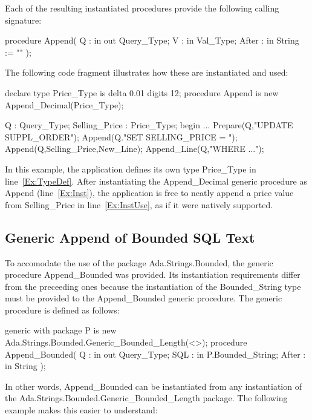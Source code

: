 \documentclass[english,letterpaper]{book}
\begin{document}
Each of the resulting instantiated procedures provide the following
calling signature:

\begin{Code}
procedure Append(
   Q :     in out Query_Type;
   V :     in     Val_Type;
   After : in     String := ""
);
\end{Code}

The following code fragment illustrates how these are instantiated and used:

\begin{NumberedExample}
declare
   type Price_Type is delta 0.01 digits 12;\label{Ex:TypeDef}
   procedure Append is new Append_Decimal(Price_Type);\label{Ex:Inst}

   Q :             Query_Type;
   Selling_Price : Price_Type;
begin
   ...
   Prepare(Q,"UPDATE SUPPL_ORDER");
   Append(Q."SET SELLING_PRICE = ");
   Append(Q,Selling_Price,New_Line);\label{Ex:InstUse}
   Append_Line(Q,"WHERE ...");
\end{NumberedExample}

In this example, the application defines its own type Price\_Type
in line~\ref{Ex:TypeDef}. After instantiating the Append\_Decimal
generic procedure as Append (line~\ref{Ex:Inst}), the application is
free to neatly append a price value from Selling\_Price in
line~\ref{Ex:InstUse}, as if it were natively supported.



\subsection{Generic Append of Bounded SQL Text}

To accomodate the use of the package Ada\-.Strings\-.Bounded,
the generic procedure Append\_Bounded was provided. Its instantiation
requirements differ from the preceeding ones because the instantiation
of the Bounded\_String type must be provided to the Append\_Bounded
generic procedure. The generic procedure is defined as follows:

\begin{Code}
generic
   with package P 
      is new Ada.Strings.Bounded.Generic_Bounded_Length(<>);
procedure Append_Bounded(
   Q :     in out Query_Type;
   SQL :   in     P.Bounded_String;
   After : in     String
);
\end{Code}

In other words, Append\_Bounded can be instantiated from any instantiation
of the Ada.Strings.Bounded.Generic\_Bounded\_Length package. The following
example makes this easier to understand:
\end{document}
